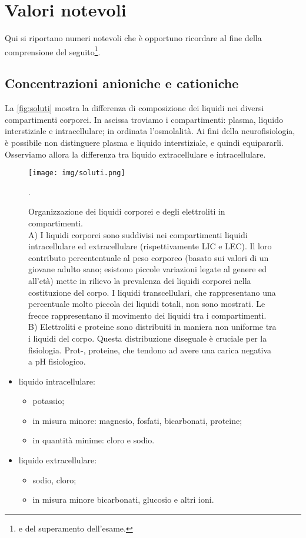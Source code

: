 \section{Valori notevoli}
Qui si riportano numeri notevoli che è opportuno ricordare al fine della comprensione del seguito\footnote{e del superamento dell'esame.}.

\subsection{Concentrazioni anioniche e cationiche}
La \autoref{fig:soluti} mostra la differenza di composizione dei liquidi nei diversi compartimenti corporei. In ascissa troviamo i compartimenti: plasma, liquido interstiziale e intracellulare; in ordinata l'osmolalità. Ai fini della neurofisiologia, è possibile non distinguere plasma e liquido interstiziale, e quindi equipararli. Osserviamo allora la differenza tra liquido extracellulare e intracellulare.

\begin{figure}[h]
    \centering
    \texttt{[image: img/soluti.png]}
    \caption[Organizzazione dei liquidi corporei e degli elettroliti in compartimenti.]{
        Organizzazione dei liquidi corporei e degli elettroliti in compartimenti.\\
        A) I liquidi corporei sono suddivisi nei compartimenti liquidi intracellulare ed extracellulare (rispettivamente LIC e LEC). Il loro contributo percententuale al peso corporeo (basato sui valori di un giovane adulto sano; esistono piccole variazioni legate al genere ed all'età) mette in rilievo la prevalenza dei liquidi corporei nella costituzione del corpo. I liquidi transcellulari, che rappresentano una percentuale molto piccola dei liquidi totali, non sono mostrati. Le frecce rappresentano il movimento dei liquidi tra i compartimenti.\\
        B) Elettroliti e proteine sono distribuiti in maniera non uniforme tra i liquidi del corpo. Questa distribuzione diseguale è cruciale per la fisio­logia. Prot-, proteine, che tendono ad avere una carica negativa a pH fisiologico.}
    \label{fig:soluti}.
\end{figure}

\begin{itemize}
    \item {liquido intracellulare}:
    \begin{itemize}
        \item potassio;
        \item in misura minore: magnesio, fosfati, bicarbonati, proteine;
        \item  in quantità minime: cloro e sodio.
    \end{itemize}
    \item {liquido extracellulare}:
    \begin{itemize}
        \item sodio, cloro;
        \item in misura minore bicarbonati, glucosio e altri ioni.
    \end{itemize}
\end{itemize}

